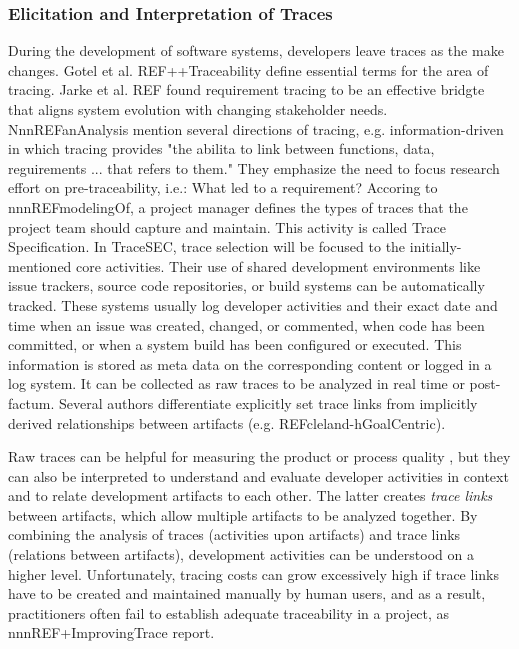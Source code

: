 \vspace{-0.5em}
\subsubsection*{Elicitation and Interpretation of Traces}
\vspace{-1em}
During the development of software systems, developers leave traces as the make changes. Gotel et al. REF++Traceability define essential terms for the area of tracing. Jarke et al. REF found requirement tracing to be an effective bridgte that aligns system evolution with changing stakeholder needs. NnnREFanAnalysis mention several directions of tracing, e.g. information-driven in which tracing provides "the abilita to link between functions, data, reguirements ... that refers to them." They emphasize the need to focus research effort on pre-traceability, i.e.: What led to a requirement? Accoring to nnnREFmodelingOf, a project manager defines the types of traces that the project team should capture and maintain. This activity is called Trace Specification. In TraceSEC, trace selection will be focused to the initially-mentioned core activities. Their use of shared development environments like issue trackers, source code repositories, or build systems can be automatically tracked. These systems usually log developer activities and their exact date and time when an issue was created, changed, or commented, when code has been committed, or when a system build has been configured or executed. This information is stored as meta data on the corresponding content or logged in a log system. It can be collected as raw traces to be analyzed in real time or post-factum. Several authors differentiate explicitly set trace links from implicitly derived relationships between artifacts (e.g. REFcleland-hGoalCentric).

Raw traces can be helpful for measuring the product \cite{ProductMeasures} or process quality \cite{ProcessMeasures}, but they can also be interpreted to understand and evaluate developer activities  in context \cite{TraceInterpretation} and to relate development artifacts to each other. The latter creates \emph{trace links} between artifacts, which allow multiple artifacts to be analyzed together. By combining the analysis of traces (activities upon artifacts) and trace links (relations between artifacts), development activities can be understood on a higher level. Unfortunately, tracing costs can grow excessively high if trace links have to be created and maintained manually by human users, and as a result, practitioners often fail to establish adequate traceability in a project, as nnnREF+ImprovingTrace report.

